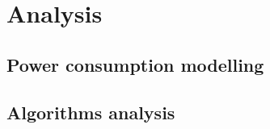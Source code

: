 \chapter{Analysis} \label{Chapter:Analysis}

\section{Power consumption modelling}

\section{Algorithms analysis}
